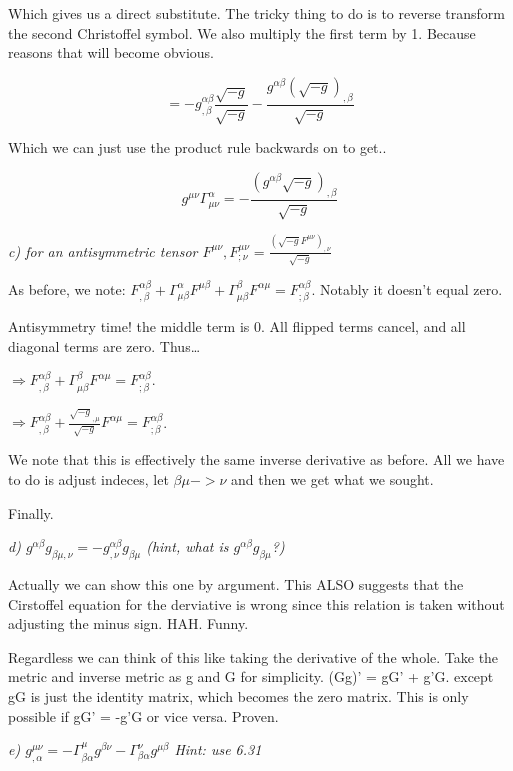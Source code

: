 \documentclass[landscape,letterpaper,10pt,english]{article}
\begin{document}
    Which gives us a direct substitute. The tricky thing to do is to reverse
transform the second Christoffel symbol. We also multiply the first term
by 1. Because reasons that will become obvious.

\[ = - g^{\alpha\beta}_{,\beta} \frac{\sqrt{-g}}{\sqrt{-g}} - \frac{g^{\alpha\beta}(\sqrt{-g})_{,\beta}}{\sqrt{-g}} \]

Which we can just use the product rule backwards on to get..

\[ g^{\mu\nu}\Gamma^\alpha_{\mu\nu} = -\frac{(g^{\alpha\beta}\sqrt{-g})_{,\beta}}{\sqrt{-g}}\]

    \emph{c) for an antisymmetric tensor
\(F^{\mu\nu}, F^{\mu\nu}_{;\nu} = \frac{(\sqrt{-g}F^{\mu\nu})_{,\nu}}{\sqrt{-g}}\)}

    As before, we note:
\(F^{\alpha\beta}_{,\beta} + \Gamma^\alpha_{\mu\beta}F^{\mu\beta} + \Gamma^\beta_{\mu\beta}F^{\alpha\mu} = F^{\alpha\beta}_{;\beta}\).
Notably it doesn't equal zero.

    Antisymmetry time! the middle term is 0. All flipped terms cancel, and
all diagonal terms are zero. Thus\ldots{}

\(\Rightarrow F^{\alpha\beta}_{,\beta} + \Gamma^\beta_{\mu\beta}F^{\alpha\mu} = F^{\alpha\beta}_{;\beta}\).

\(\Rightarrow F^{\alpha\beta}_{,\beta} + \frac{\sqrt{-g}_{,\mu}}{\sqrt{-g}}F^{\alpha\mu} = F^{\alpha\beta}_{;\beta}\).

    We note that this is effectively the same inverse derivative as before.
All we have to do is adjust indeces, let \(\beta \mu -> \nu\) and then
we get what we sought.

Finally.

    \emph{d)
\(g^{\alpha\beta}g_{\beta\mu,\nu} = -g^{\alpha\beta}_{,\nu} g_{\beta\mu}\)
(hint, what is \(g^{\alpha\beta}g_{\beta\mu}\)?)}

    Actually we can show this one by argument. This ALSO suggests that the
Cirstoffel equation for the derviative is wrong since this relation is
taken without adjusting the minus sign. HAH. Funny.

Regardless we can think of this like taking the derivative of the whole.
Take the metric and inverse metric as g and G for simplicity. (Gg)' =
gG' + g'G. except gG is just the identity matrix, which becomes the zero
matrix. This is only possible if gG' = -g'G or vice versa. Proven.

    \emph{e)
\(g^{\mu\nu}_{,\alpha} = -\Gamma^{\mu}_{\beta\alpha}g^{\beta\nu} - \Gamma^{\nu}_{\beta\alpha}g^{\mu\beta}\)
Hint: use 6.31}
\end{document}
